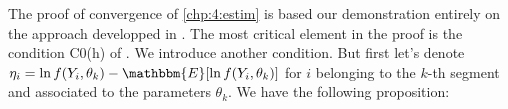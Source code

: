 \begin{appendices}



The proof of convergence of \ref{chp:4:estim} is based our demonstration entirely on the approach developped in \cite{Lavielle1997}. The most critical element in the proof is the condition C0(h) of \cite{Lavielle1997}. We introduce another condition. But first let's denote $\eta_i = \ln f(Y_i,\theta_{k})-\mathbbm{E}[\ln f(Y_i,\theta_{k})]$ for $i$ belonging to the $k$-th segment and associated to the parameters $\theta_{k}$. We have the following proposition: 
 

\end{appendices}
